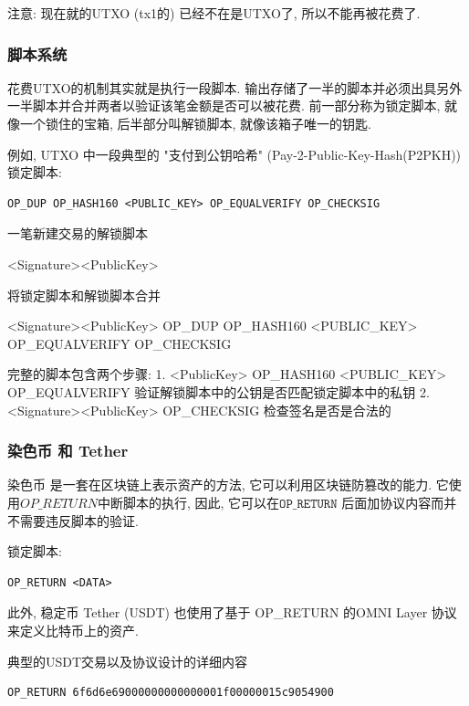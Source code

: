 \documentclass[a4paper,11pt]{article}
\begin{document}
注意: 现在就的UTXO (tx1的) 已经不在是UTXO了, 所以不能再被花费了.

\subsubsection*{脚本系统}

花费UTXO的机制其实就是执行一段脚本. 输出存储了一半的脚本并必须出具另外一半脚本并合并两者以验证该笔金额是否可以被花费. 前一部分称为锁定脚本, 就像一个锁住的宝箱, 后半部分叫解锁脚本, 就像该箱子唯一的钥匙.

例如, UTXO 中一段典型的 "支付到公钥哈希" (Pay-2-Public-Key-Hash(P2PKH)\cite{P2PKH}) 锁定脚本:

\begin{lstlisting}
OP_DUP OP_HASH160 <PUBLIC_KEY> OP_EQUALVERIFY OP_CHECKSIG
\end{lstlisting}

一笔新建交易的解锁脚本

<Signature><PublicKey>

将锁定脚本和解锁脚本合并

<Signature><PublicKey> OP\_DUP OP\_HASH160 <PUBLIC\_KEY> OP\_EQUALVERIFY OP\_CHECKSIG

完整的脚本包含两个步骤:
1. <PublicKey>  OP\_HASH160 <PUBLIC\_KEY> OP\_EQUALVERIFY
	验证解锁脚本中的公钥是否匹配锁定脚本中的私钥
2.  <Signature><PublicKey> OP\_CHECKSIG
	检查签名是否是合法的

\subsubsection*{染色币 和 Tether}

染色币\cite{ColoredCoins} 是一套在区块链上表示资产的方法, 它可以利用区块链防篡改的能力. 它使用${OP\_RETURN}$中断脚本的执行, 因此, 它可以在$\texttt{OP\_RETURN}$ 后面加协议内容而并不需要违反脚本的验证.

锁定脚本:
\begin{lstlisting}
OP_RETURN <DATA>
\end{lstlisting}

此外, 稳定币 Tether\cite{Tether} (USDT) 也使用了基于 OP\_RETURN 的OMNI Layer 协议来定义比特币上的资产.

典型的USDT交易以及协议设计的详细内容

\lstset{basicstyle=\tiny,style=myListStyle}
\begin{lstlisting}
OP_RETURN 6f6d6e69000000000000001f00000015c9054900
\end{lstlisting}
\end{document}
